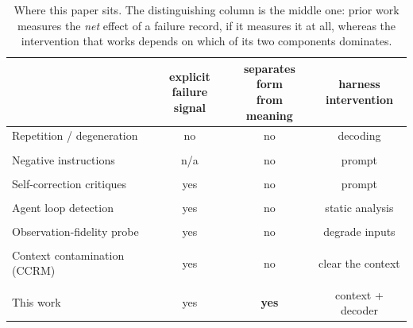 \begin{table}[t]
\centering
\footnotesize
\setlength{\tabcolsep}{4pt}
\begin{tabular}{l c c c}
\toprule
 & \makecell{explicit\\failure signal} & \makecell{separates form\\from meaning} & \makecell{harness\\intervention} \\
\midrule
Repetition / degeneration                  & no  & no  & decoding \\
\quad \citep{xu2022breaktheloop,holtzman2020degeneration} & & & \\
Negative instructions                      & n/a & no  & prompt \\
\quad \citep{castricato2024pinkelephants}  & & & \\
Self-correction critiques                  & yes & no  & prompt \\
\quad \citep{huang2024selfcorrect,shinn2023reflexion} & & & \\
Agent loop detection                       & yes & no  & static analysis \\
\quad \citep{hou2026infiniteloops}         & & & \\
Observation-fidelity probe                 & yes & no  & degrade inputs \\
\quad \citep{zenkri2026fidelity}           & & & \\
Context contamination (CCRM)               & yes & no  & clear the context \\
\quad \citep{yang2026contamination}        & & & \\
\midrule
This work                                  & yes & \textbf{yes} & context + decoder \\
\bottomrule
\end{tabular}
\caption{Where this paper sits. The distinguishing column is the middle one:
prior work measures the \emph{net} effect of a failure record, if it measures it
at all, whereas the intervention that works depends on which of its two
components dominates.}
\label{tab:related}
\end{table}
